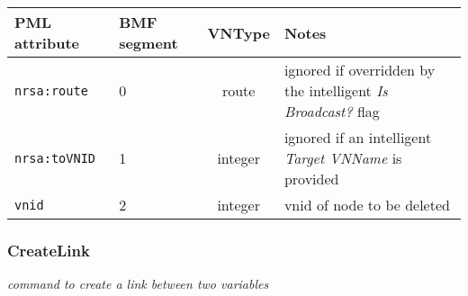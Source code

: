 \documentclass[pdftex,a4paper]{article}
\newcommand{\XMLfont}[1]{{\tt \small #1}}
\begin{document}
\begin{table}[!h]
  \begin{center}
    \label{tab:DeleteNode}
    \begin{tabular}{|l|p{13mm}|c|p{60mm}|}
      \hline

      \textbf{PML attribute} & \textbf{BMF segment} & \textbf{VNType}
      & \textbf{Notes} \\\hline

      \XMLfont{nrsa:route} & 0 & route & ignored if overridden by the
      intelligent {\em Is Broadcast?} flag \\\hline

      \XMLfont{nrsa:toVNID} & 1 & integer & ignored if an intelligent {\em
      Target VNName} is provided \\\hline

      \XMLfont{vnid} & 2 & integer & vnid of node to be deleted
      \\\hline


    \end{tabular}
  \end{center}
\end{table}

\clearpage
\subsubsection{CreateLink}

{\em command to create a link between two variables}
\end{document}
